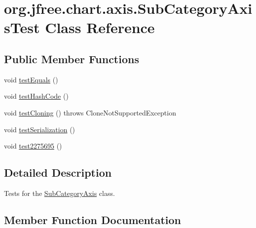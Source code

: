 \hypertarget{classorg_1_1jfree_1_1chart_1_1axis_1_1_sub_category_axis_test}{}\section{org.\+jfree.\+chart.\+axis.\+Sub\+Category\+Axis\+Test Class Reference}
\label{classorg_1_1jfree_1_1chart_1_1axis_1_1_sub_category_axis_test}
\subsection*{Public Member Functions}
\begin{DoxyCompactItemize}
\item 
void \mbox{\hyperlink{classorg_1_1jfree_1_1chart_1_1axis_1_1_sub_category_axis_test_a5d039896916ba05994b8e0751e2ec185}{test\+Equals}} ()
\item 
void \mbox{\hyperlink{classorg_1_1jfree_1_1chart_1_1axis_1_1_sub_category_axis_test_a590e41907e5ce44911973ecc4b90afc4}{test\+Hash\+Code}} ()
\item 
void \mbox{\hyperlink{classorg_1_1jfree_1_1chart_1_1axis_1_1_sub_category_axis_test_a26962d02166a94509a58c03d2b61da71}{test\+Cloning}} ()  throws Clone\+Not\+Supported\+Exception 
\item 
void \mbox{\hyperlink{classorg_1_1jfree_1_1chart_1_1axis_1_1_sub_category_axis_test_a12641eb701fe29f5dd042c71572fb721}{test\+Serialization}} ()
\item 
void \mbox{\hyperlink{classorg_1_1jfree_1_1chart_1_1axis_1_1_sub_category_axis_test_acb3d28c1976487f882b040731be34cde}{test2275695}} ()
\end{DoxyCompactItemize}


\subsection{Detailed Description}
Tests for the \mbox{\hyperlink{classorg_1_1jfree_1_1chart_1_1axis_1_1_sub_category_axis}{Sub\+Category\+Axis}} class. 

\subsection{Member Function Documentation}
\mbox{\label{classorg_1_1jfree_1_1chart_1_1axis_1_1_sub_category_axis_test_acb3d28c1976487f882b040731be34cde}} 
